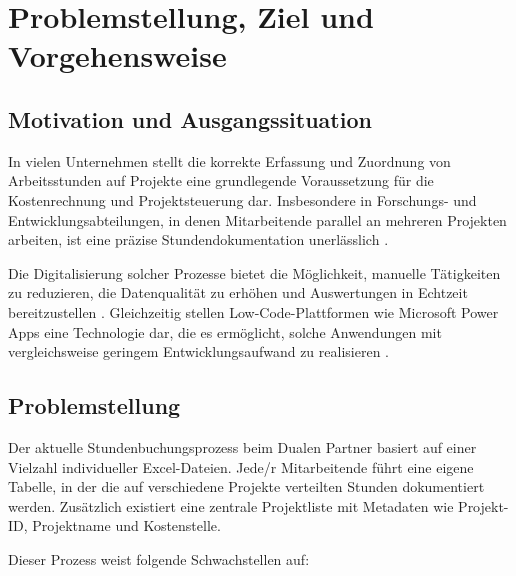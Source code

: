 
\chapter{Problemstellung, Ziel und Vorgehensweise}
\label{chap:einleitung}

\section{Motivation und Ausgangssituation}
\label{sec:motivation}

In vielen Unternehmen stellt die korrekte Erfassung und Zuordnung von 
Arbeitsstunden auf Projekte eine grundlegende Voraussetzung für die 
Kosten\-rechnung und Projekt\-steuerung dar. Insbesondere in 
Forschungs- und Entwicklungsabteilungen, in denen Mitarbeitende 
parallel an mehreren Projekten arbeiten, ist eine präzise 
Stundendokumentation unerlässlich \cite[vgl.][S.~34]{controlling_buch}.

Die Digitalisierung solcher Prozesse bietet die Möglichkeit, manuelle 
Tätigkeiten zu reduzieren, die Datenqualität zu erhöhen und 
Auswertungen in Echtzeit bereitzustellen 
\cite[vgl.][S.~12\,ff.]{digitalisierung2024}. Gleichzeitig stellen 
Low-Code-Plattformen wie Microsoft Power Apps eine Technologie dar, 
die es ermöglicht, solche Anwendungen mit vergleichsweise geringem 
Entwicklungsaufwand zu realisieren \cite[vgl.][S.~8]{microsoft_lowcode}.

\section{Problemstellung}
\label{sec:problemstellung}

Der aktuelle Stundenbuchungsprozess beim Dualen Partner basiert auf 
einer Vielzahl individueller Excel-Dateien. Jede/r Mitarbeitende führt 
eine eigene Tabelle, in der die auf verschiedene Projekte verteilten 
Stunden dokumentiert werden. Zusätzlich existiert eine zentrale 
Projektliste mit Metadaten wie Projekt-ID, Projektname und 
Kostenstelle.

Dieser Prozess weist folgende Schwachstellen auf:

